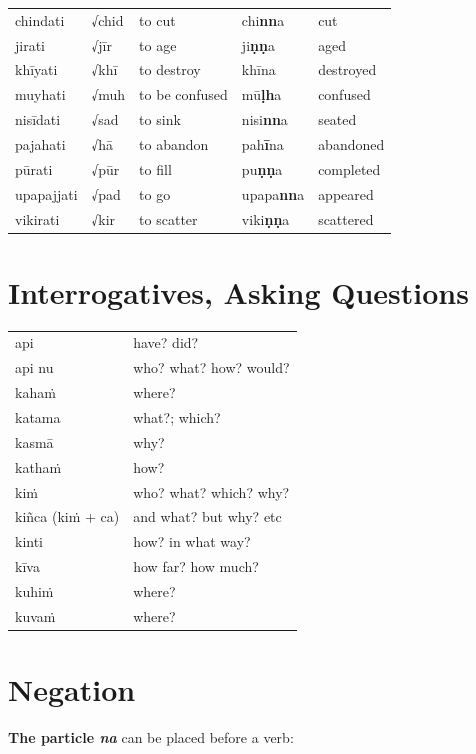 \documentclass[11pt,oneside]{memoir}
\begin{document}
\begin{center}
\begin{tabular}{lllll}
chindati & √chid & to cut & chi\textbf{nn}a & cut\\
jirati & √jīr & to age & ji\textbf{ṇṇ}a & aged\\
khīyati & √khī & to destroy & khīna & destroyed\\
muyhati & √muh & to be confused & mū\textbf{ḷh}a & confused\\
nisīdati & √sad & to sink & nisi\textbf{nn}a & seated\\
pajahati & √hā & to abandon & pah\textbf{ī}na & abandoned\\
pūrati & √pūr & to fill & pu\textbf{ṇṇ}a & completed\\
upapajjati & √pad & to go & upapa\textbf{nn}a & appeared\\
vikirati & √kir & to scatter & viki\textbf{ṇṇ}a & scattered\\
\end{tabular}
\end{center}
\section{Interrogatives, Asking Questions}
\label{sec:org89b8818}

\begin{center}
\begin{tabular}{ll}
api & have? did?\\
api nu & who? what? how? would?\\
kahaṁ & where?\\
katama & what?; which?\\
kasmā & why?\\
kathaṁ & how?\\
kiṁ & who? what? which? why?\\
kiñca (kiṁ + ca) & and what? but why? etc\\
kinti & how? in what way?\\
kīva & how far? how much?\\
kuhiṁ & where?\\
kuvaṁ & where?\\
\end{tabular}
\end{center}
\section{Negation}
\label{sec:orgdbaf3ea}

\textbf{The particle \emph{na}} can be placed before a verb:
\end{document}
